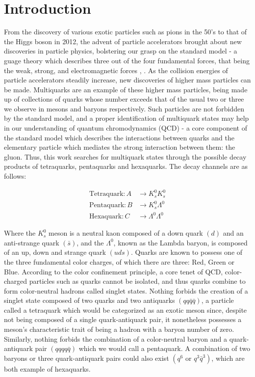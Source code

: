 \documentclass{article}
\begin{document}
\section{Introduction}
From the discovery of various exotic particles such as pions in the 50's to that of the Higgs
boson in 2012, the advent of particle accelerators brought about new discoveries in particle physics,
bolstering our grasp on the standard model - a guage theory which describes three out of the four
fundamental forces, that being the weak, strong, and electromagnetic forces \cite{KLDiscovery}, \cite{HiggsDiscovery}. 
As the collision energies of particle accelerators steadily increase, new discoveries of higher mass particles 
can be made. 
Multiquarks are an example of these higher mass particles, being made up of collections of quarks
whose number exceeds that of the usual two or three we observe in mesons and baryons respectively.
Such particles are not forbidden by the standard model, and a proper identification of multiquark 
states may help in our understanding of quantum chromodynamics (QCD) - a core component of the standard 
model which describes the interactions between quarks and the elementary particle which mediates 
the strong interaction between them: the gluon. Thus, this work searches for multiquark states 
through the possible decay products of tetraquarks, pentaquarks and hexaquarks. The decay channels
are as follows:

\begin{align*}
\text{Tetraquark}: A &\rightarrow K^0_sK^0_s \\
\text{Pentaquark}: B &\rightarrow K^0_s\Lambda^0 \\
\text{Hexaquark}:  C &\rightarrow \Lambda^0\Lambda^0
\end{align*}

Where the $K^0_s$ meson is a neutral kaon composed of a down quark $(d)$ and an
anti-strange quark $(\bar{s})$, and the $\Lambda^0$, known as the Lambda baryon,
is composed of an up, down and strange quark $(uds)$. Quarks are known to
possess one of the three fundamental color charges, of which there are three:
Red, Green or Blue. According to the color confinement principle, a core tenet
of QCD, color-charged particles such as quarks cannot be isolated, and thus
quarks combine to form color-neutral hadrons called singlet states. Nothing
forbids the creation of a singlet state composed of two quarks and two
antiquarks $(qq\bar{q}\bar{q})$, a particle called a tetraquark which would be
categorized as an exotic meson since, despite not being composed of a single
quark-antiquark pair, it nonetheless possesses a meson's characteristic trait of
being a hadron with a baryon number of zero. Similarly, nothing forbids the
combination of a color-neutral baryon and a quark-antiquark pair $(qqqq\bar{q})$
which we would call a pentaquark. A combination of two baryons or three
quark-antiquark pairs could also exist $(q^6 \text{ or } q^3\bar{q}^{3})$, which
are both example of hexaquarks.
\end{document}
